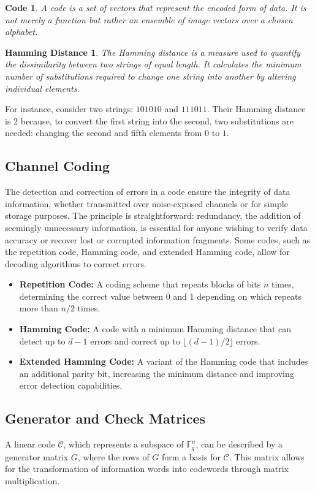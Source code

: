 \newtheorem*{cd}{Code}
\begin{cd}
A code is a set of vectors that represent the encoded form of data. It is not merely a function but rather an ensemble of image vectors over a chosen alphabet.
\end{cd}

\newtheorem*{hmm}{Hamming Distance}
\begin{hmm}
The Hamming distance is a measure used to quantify the dissimilarity between two strings of equal length. It calculates the minimum number of substitutions required to change one string into another by altering individual elements.
\end{hmm}

For instance, consider two strings: $101010$ and $111011$. Their Hamming distance is 2 because, to convert the first string into the second, two substitutions are needed: changing the second and fifth elements from $0$ to $1$.

\subsection{Channel Coding}
The detection and correction of errors in a code ensure the integrity of data information, whether transmitted over noise-exposed channels or for simple storage purposes. The principle is straightforward: redundancy, the addition of seemingly unnecessary information, is essential for anyone wishing to verify data accuracy or recover lost or corrupted information fragments. Some codes, such as the repetition code, Hamming code, and extended Hamming code, allow for decoding algorithms to correct errors.

\begin{itemize}
    \item \textbf{Repetition Code:} A coding scheme that repeats blocks of bits $n$ times, determining the correct value between 0 and 1 depending on which repeats more than $n/2$ times.
    \item \textbf{Hamming Code:} A code with a minimum Hamming distance that can detect up to $d - 1$ errors and correct up to $\lfloor (d-1)/2 \rfloor$ errors.
    \item \textbf{Extended Hamming Code:} A variant of the Hamming code that includes an additional parity bit, increasing the minimum distance and improving error detection capabilities.
\end{itemize}

\subsection{Generator and Check Matrices}
A linear code \(\mathcal{C}\), which represents a subspace of \(\mathbb{F}_q^n\), can be described by a generator matrix \(G\), where the rows of \(G\) form a basis for \(\mathcal{C}\). This matrix allows for the transformation of information words into codewords through matrix multiplication.

